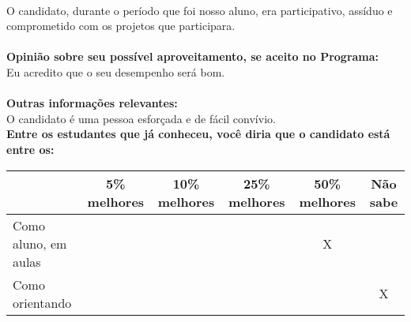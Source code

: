 \documentclass[11pt]{article}
\begin{document}
\\O candidato, durante o período que foi nosso aluno, era participativo, assíduo e comprometido com  os projetos que participara.     \\
\\
\textbf{Opinião sobre seu possível aproveitamento, se aceito no Programa:}
\\Eu acredito que o seu desempenho será bom.\\ 
\\
\textbf{Outras informações relevantes:} \\O candidato é uma pessoa esforçada e  de fácil convívio.
\\[0.3cm]
\textbf{Entre os estudantes que já conheceu, você diria que o candidato está entre os:}
\\
\begin{tabular}{|l|c|c|c|c|c|}
\hline
 & 5\% melhores & 10\% melhores & 25\% melhores & 50\% melhores & Não sabe \\
\hline
Como aluno, em aulas &  &  &  & X & \\
\hline
Como orientando &  &  &  &  & X\\
\hline
\end{tabular}
\end{document}
